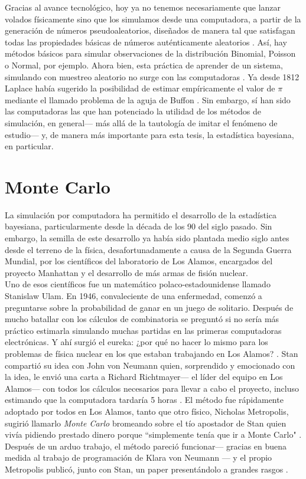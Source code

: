 Gracias al avance tecnológico, hoy ya no tenemos necesariamente que lanzar volados físicamente sino que los simulamos desde una computadora, a partir de la generación de números pseudoaleatorios, diseñados de manera tal que satisfagan todas las propiedades básicas de números auténticamente aleatorios \parencite{Ross13}. Así, hay métodos básicos para simular observaciones de la distribución Binomial, Poisson o Normal, por ejemplo. Ahora bien, esta práctica de aprender de un sistema, simulando con muestreo aleatorio no surge con las computadoras \parencite{Owen13}. Ya desde 1812 Laplace había sugerido la posibilidad de estimar empíricamente el valor de $\pi$ mediante el llamado problema de la aguja de Buffon \parencite{Ragheb13}. Sin embargo, sí han sido las computadoras las que han potenciado la utilidad de los métodos de simulación, en general--- más allá de la tautología de imitar el fenómeno de estudio--- y, de manera más importante para esta tesis, la estadística bayesiana, en particular.

\section{Monte Carlo} 

La simulación por computadora ha permitido el desarrollo de la estadística bayesiana, particularmente desde la década de los 90 del siglo pasado. Sin embargo, la semilla de este desarrollo ya había sido plantada medio siglo antes desde el terreno de la física, desafortunadamente a causa de la Segunda Guerra Mundial, por los científicos del laboratorio de Los Alamos, encargados del proyecto Manhattan y el desarrollo de más armas de fisión nuclear.\\

Uno de esos científicos fue un matemático polaco-estadounidense llamado Stanislaw Ulam. En 1946, convaleciente de una enfermedad, comenzó a preguntarse sobre la probabilidad de ganar en un juego de solitario. Después de mucho batallar con los cálculos de combinatoria se preguntó si no sería más práctico estimarla simulando muchas partidas en las primeras computadoras electrónicas. Y ahí surgió el eureka: ¿por qué no hacer lo mismo para los problemas de física nuclear en los que estaban trabajando en Los Alamos? \parencite{Eckhardt87}. Stan compartió su idea con John von Neumann quien, sorprendido y emocionado con la idea, le envió una carta a Richard Richtmayer--- el líder del equipo en Los Alamos--- con todos los cálculos necesarios para llevar a cabo el proyecto, incluso estimando que la computadora tardaría 5 horas \parencite{vonNeumann47}. El método fue rápidamente adoptado por todos en Los Alamos, tanto que otro físico, Nicholas Metropolis, sugirió llamarlo \textit{Monte Carlo} bromeando sobre el tío apostador de Stan quien vivía pidiendo prestado dinero porque ``simplemente tenía que ir a Monte Carlo" \parencite{Metropolis87}. Después de un arduo trabajo, el método pareció funcionar--- gracias en buena medida al trabajo de programación de Klara von Neumann \parencite{Haigh14}--- y el propio Metropolis publicó, junto con Stan, un paper presentándolo a grandes rasgos \parencite{MetropolisUlam49}.


